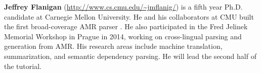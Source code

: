 \documentclass[11pt,letterpaper]{article}
\begin{document}
\noindent \textbf{Jeffrey Flanigan} (\url{http://www.cs.cmu.edu/~jmflanig/}) is a fifth year Ph.D. candidate at Carnegie Mellon University.
He and his collaborators at CMU built the first broad-coverage AMR parser \citep{flanigan-14}.
He also participated in the Fred Jelinek Memorial Workshop in Prague in 2014, working on cross-lingual parsing and generation from AMR.
His research areas include machine translation, summarization, and semantic dependency parsing.
He will lead the second half of the tutorial.


\setlength{\bibsep}{1pt}
{\fontsize{10}{12.25}\selectfont
}
\end{document}
